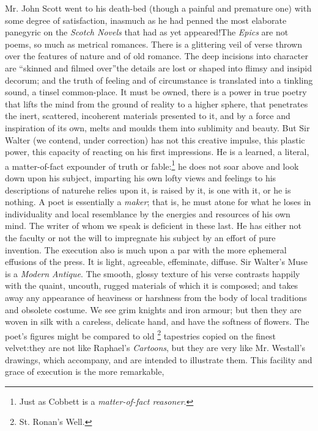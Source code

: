 Mr. John Scott went to his death-bed (though a painful and
premature one) with some degree of satisfaction, inasmuch as he
had penned the most elaborate panegyric on the \emph{Scotch Novels}
that had as yet appeared!\textemdash The \emph{Epics} are not poems, so much as
metrical romances.  There is a glittering veil of verse thrown
over the features of nature and of old romance. The deep incisions
into character are ``skinned and filmed over''\textemdash the details are lost
or shaped into flimsy and insipid decorum; and the truth of
feeling and of circumstance is translated into a tinkling sound, a
tinsel common-place. It must be owned, there is a power in true
poetry that lifts the mind from the ground of reality to a higher
sphere, that penetrates the inert, scattered, incoherent materials
presented to it, and by a force and inspiration of its own, melts
and moulds them into sublimity and beauty. But Sir Walter (we
contend, under correction) has not this creative impulse, this
plastic power, this capacity of reacting on his first
impressions. He is a learned, a literal, a matter-of-fact
expounder of truth or fable:\footnote{Just as Cobbett is a
  \emph{matter-of-fact reasoner}.} he does not soar above and look
down upon his subject, imparting his own lofty views and feelings
to his descriptions of nature\textemdash he relies upon it, is raised by it,
is one with it, or he is nothing. A poet is essentially a \emph{maker};
that is, he must atone for what he loses in individuality and
local resemblance by the energies and resources of his own
mind. The writer of whom we speak is deficient in these last. He
has either not the faculty or not the will to impregnate his
subject by an effort of pure invention. The execution also is much
upon a par with the more ephemeral effusions of the press. It is
light, agreeable, effeminate, diffuse. Sir Walter's Muse is a
\emph{Modern Antique}. The smooth, glossy texture of his verse
contrasts happily with the quaint, uncouth, rugged materials of
which it is composed; and takes away any appearance of heaviness
or harshness from the body of local traditions and obsolete
costume. We see grim knights and iron armour; but then they are
woven in silk with a careless, delicate hand, and have the
softness of flowers. The poet's figures might be compared to old
\footnote{St. Ronan's Well.} tapestries copied on the finest velvet:\textemdash they are not like
Raphael's \emph{Cartoons}, but they are very like Mr. Westall's
drawings, which accompany, and are intended to illustrate
them. This facility and grace of execution is the more remarkable,
